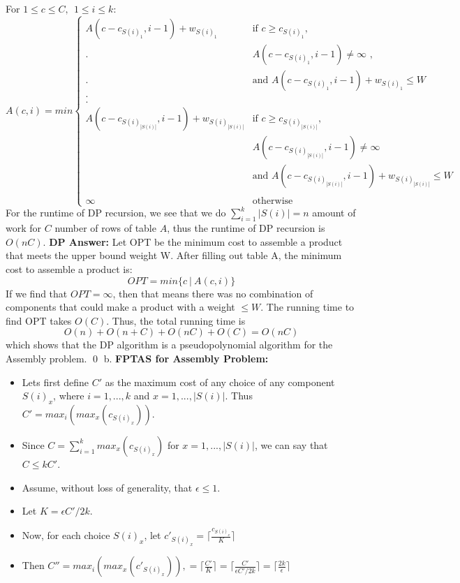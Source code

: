 \documentclass[oneside]{homework} %
\begin{document}
\newline
\newline
For $1 \leq c \leq C, \ \ 1 \leq i \leq k$:
\begin{equation*}
  A(c,i) = min
  \begin{cases}
    A(c-c_{S(i)_1}, i-1) + w_{S(i)_1} & \text{if $c \geq c_{S(i)_1}$,} \\
    . & \text{$A(c-c_{S(i)_1}, i-1) \neq \infty$ ,} \\
    . & \text{and $A(c-c_{S(i)_1}, i-1) + w_{S(i)_1} \leq W$} \\
    . \\
    . \\
    A(c-c_{S(i)_{|S(i)|}}, i-1) + w_{S(i)_{|S(i)|}} & \text{if $c \geq c_{S(i)_{|S(i)|}}$,} \\
     & \text{$A(c-c_{S(i)_{|S(i)|}}, i-1) \neq \infty$} \\
     & \text{and $A(c-c_{S(i)_{|S(i)|}}, i-1) + w_{S(i)_{|S(i)|}} \leq W$} \\
     \\
    \infty & \text{otherwise}
  \end{cases}
\end{equation*}
\newline
For the runtime of DP recursion, we see that we do $\sum\limits_{i=1}^{k}|S(i)| = n$ amount of work for $C$ number of rows of table $A$, thus the runtime of DP recursion is $O(nC)$.
\newline
\newline 
\textbf{DP Answer:}
\newline
Let OPT be the minimum cost to assemble a product that meets the upper bound weight W. After filling out table A, the minimum cost to assemble a product is: $$OPT = min\{ c \ | \ A(c,i) \}$$ If we find that $OPT = \infty$, then that means there was no combination of components that could make a product with a weight $\leq W$. The running time to find OPT takes $O(C)$. Thus, the total running time is $$O(n) + O(n + C) + O(nC) + O(C) = O(nC)$$ which shows that the DP algorithm is a pseudopolynomial algorithm for the Assembly problem. \hfill\qed
\newline
\newline
{\large b.} \textbf{FPTAS for Assembly Problem:}
\begin{itemize}
  \item Lets first define $C'$ as the maximum cost of any choice of any component $S(i)_x$, where $i = 1,...,k$ and $x = 1,...,|S(i)|$. Thus $C' = max_i(max_x(c_{S(i)_x}))$.
  \item Since $C = \sum\limits_{i=1}^{k}max_x(c_{S(i)_x})$ for $x = 1,...,|S(i)|$, we can say that $C \leq kC'$.
  \item Assume, without loss of generality, that $\epsilon \leq 1$.
  \item Let $K = \epsilon C' / 2k$.
  \item Now, for each choice $S(i)_x$, let $c'_{S(i)_x} = \lceil\frac{c_{S(i)_x}}{K}\rceil$
  \item Then $C'' = max_i(max_x(c'_{S(i)_x})) ,= \lceil\frac{C'}{K}\rceil = \lceil\frac{C'}{\epsilon C'/2k}\rceil = \lceil\frac{2k}{\epsilon}\rceil$
\end{itemize}
\end{document}
